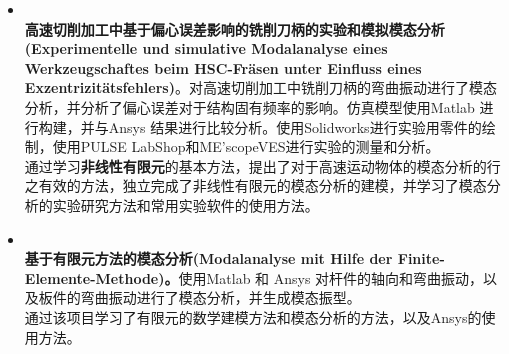 \documentclass[zh]{resume}
\begin{document}
\begin{itemize}
	\item 
	\\
	\textbf{高速切削加工中基于偏心误差影响的铣削刀柄的实验和模拟模态分析(Experimentelle und simulative Modalanalyse eines Werkzeugs\-chaftes beim HSC-Fräsen unter Einfluss eines Exzentrizitätsfehlers)}。对高速切削加工中铣削刀柄的弯曲振动进行了模态分析，并分析了偏心误差对于结构固有频率的影响。仿真模型使用Matlab 进行构建，并与Ansys 结果进行比较分析。使用Solidworks进行实验用零件的绘制，使用PULSE LabShop和ME'scopeVES进行实验的测量和分析。\\
	通过学习\textbf{非线性有限元}的基本方法，提出了对于高速运动物体的模态分析的行之有效的方法，独立完成了非线性有限元的模态分析的建模，并学习了模态分析的实验研究方法和常用实验软件的使用方法。
	
	\item 
	\\
    \textbf{基于有限元方法的模态分析(Modalanalyse mit Hilfe der Finite-Elemente-Methode)。}使用Matlab 和 Ansys 对杆件的轴向和弯曲振动，以及板件的弯曲振动进行了模态分析，并生成模态振型。\\
    通过该项目学习了有限元的数学建模方法和模态分析的方法，以及Ansys的使用方法。
	
	
	
	
	
  		
\end{itemize}
\end{document}
